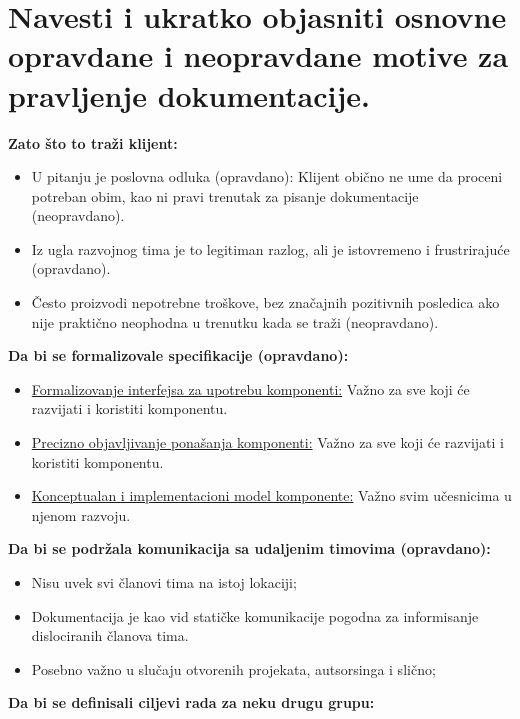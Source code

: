 \documentclass[a4paper]{article}
\begin{document}
\section{Navesti i ukratko objasniti osnovne opravdane i 
         neopravdane motive za pravljenje dokumentacije.}
  \noindent \textbf{Zato što to traži klijent:}
  \begin{itemize}
    \item U pitanju je poslovna odluka (opravdano): Klijent obično ne ume da proceni potreban obim, 
          kao ni pravi trenutak za pisanje dokumentacije (neopravdano).
    \item Iz ugla razvojnog tima je to legitiman razlog, ali je istovremeno i frustrirajuće (opravdano).
    \item Često proizvodi nepotrebne troškove, bez značajnih pozitivnih posledica ako nije 
          praktično neophodna u trenutku kada se traži (neopravdano).
  \end{itemize}
  \textbf{Da bi se formalizovale specifikacije (opravdano):}
  \begin{itemize}
    \item \underline{Formalizovanje interfejsa za upotrebu komponenti:} 
          Važno za sve koji će razvijati i koristiti komponentu.
    \item \underline{Precizno objavljivanje ponašanja komponenti:}
          Važno za sve koji će razvijati i koristiti komponentu.
    \item \underline{Konceptualan i implementacioni model komponente:} 
          Važno svim učesnicima u njenom razvoju.
  \end{itemize}
  \textbf{Da bi se podržala komunikacija sa udaljenim timovima (opravdano):}
  \begin{itemize}
    \item Nisu uvek svi članovi tima na istoj lokaciji;
    \item Dokumentacija je kao vid statičke komunikacije pogodna za informisanje 
          dislociranih članova tima. 
    \item Posebno važno u slučaju otvorenih projekata, autsorsinga i slično;
  \end{itemize}
  \textbf{Da bi se definisali ciljevi rada za neku drugu grupu:}
\end{document}
